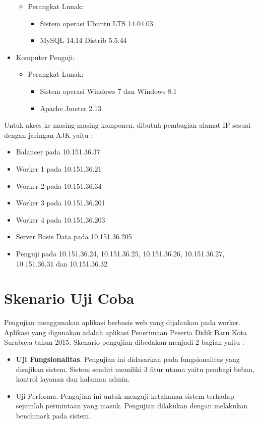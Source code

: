 \documentclass{ta-its}
\begin{document}
\begin{itemize}
\begin{itemize}
\begin{itemize}
					\end{itemize}
					\item Perangkat Lunak:
					\begin{itemize}
						\item Sistem operasi Ubuntu LTS 14.04.03
						\item MySQL 14.14 Distrib 5.5.44
					\end{itemize}
				\end{itemize}
				\item Komputer Penguji:
				\begin{itemize}
					\item Perangkat Lunak:
					\begin{itemize}
						\item Sistem operasi Windows 7 dan Windows 8.1
						\item Apache Jmeter 2.13
					\end{itemize}
				\end{itemize}
				
			\end{itemize}
			
			Untuk akses ke masing-masing komponen, dibutuh pembagian alamat IP sesuai dengan jaringan AJK yaitu :
			
			\begin{itemize}
				\item Balancer pada 10.151.36.37
				\item Worker 1 pada 10.151.36.21
				\item Worker 2 pada 10.151.36.34
				\item Worker 3 pada 10.151.36.201
				\item Worker 4 pada 10.151.36.203
				\item Server Basis Data pada 10.151.36.205
				\item Penguji pada 10.151.36.24, 10.151.36.25, 10.151.36.26, 10.151.36.27,
				10.151.36.31 dan 10.151.36.32
			\end{itemize}
			
		\section{Skenario Uji Coba}
		Pengujian menggunakan aplikasi berbasis web yang dijalankan pada worker. Aplikasi yang digunakan adalah aplikasi Penerimaan Peserta Didik Baru Kota Surabaya tahun 2015. Skenario pengujian dibedakan menjadi 2 bagian yaitu :
		\begin{itemize}
			\item \textbf{Uji Fungsionalitas}. Pengujian ini didasarkan pada fungsionalitas yang disajikan sistem. Sistem sendiri memiliki 3 fitur utama yaitu pembagi beban, kontrol layanan dan halaman admin.
			\item Uji Performa. Pengujian ini untuk menguji ketahanan sistem terhadap sejumlah permintaan yang masuk. Pengujian dilakukan dengan melakukan benchmark pada sistem.
		\end{itemize}
		 

\appendix %

\backmatter %
\end{document}
